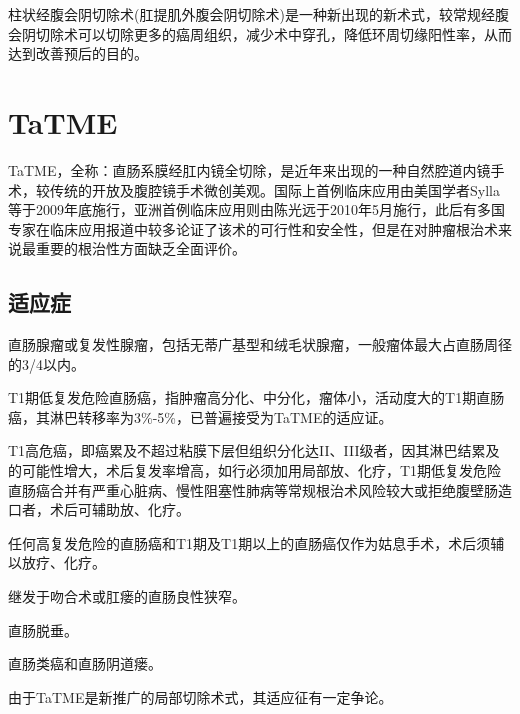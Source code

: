 \documentclass[a4paper,11pt,onecolumn,twoside]{article}
\begin{document}
\begin{multicols}{2}
    柱状经腹会阴切除术(肛提肌外腹会阴切除术)是一种新出现的新术式\supercite{4}，较常规经腹会阴切除术可以切除更多的癌周组织，减少术中穿孔，降低环周切缘阳性率，从而达到改善预后的目的。

    \section{TaTME}
    TaTME，全称：直肠系膜经肛内镜全切除，是近年来出现的一种自然腔道内镜手术，较传统的开放及腹腔镜手术微创美观。国际上首例临床应用由美国学者Sylla\supercite{5}等于2009年底施行，亚洲首例临床应用则由陈光远于2010年5月施行，此后有多国专家在临床应用报道中较多论证了该术的可行性和安全性\supercite{6,7,8}，但是在对肿瘤根治术来说最重要的根治性方面缺乏全面评价。

    \subsection{适应症}
    \begin{compactenum}
        \item 直肠腺瘤或复发性腺瘤，包括无蒂广基型和绒毛状腺瘤，一般瘤体最大占直肠周径的3/4以内\supercite{9,10}。
        \item T1期低复发危险直肠癌，指肿瘤高分化、中分化，瘤体小，活动度大的T1期直肠癌，其淋巴转移率为3\%-5\%，已普遍接受为TaTME的适应证。
        \item T1高危癌，即癌累及不超过粘膜下层但组织分化达II、III级者，因其淋巴结累及的可能性增大，术后复发率增高，如行必须加用局部放、化疗，T1期低复发危险直肠癌合并有严重心脏病、慢性阻塞性肺病等常规根治术风险较大或拒绝腹壁肠造口者，术后可辅助放、化疗\supercite{11}。
        \item 任何高复发危险的直肠癌和T1期及T1期以上的直肠癌仅作为姑息手术，术后须辅以放疗、化疗。
        \item 继发于吻合术或肛瘘的直肠良性狭窄。
        \item 直肠脱垂。
        \item 直肠类癌和直肠阴道瘘。
    \end{compactenum}

    由于TaTME是新推广的局部切除术式，其适应征有一定争论。


\end{multicols}
\end{document}
